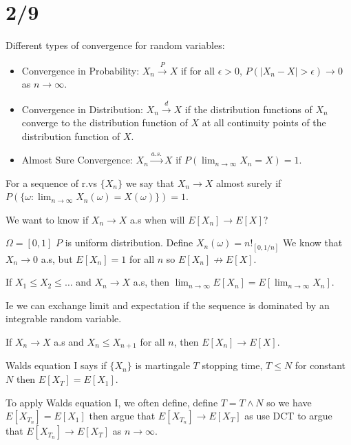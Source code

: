 \documentclass[answers,12pt,addpoints]{exam}
\begin{document}
\section{2/9}
\begin{remark}
    Different types of convergence for random variables:
    \begin{itemize}
        \item Convergence in Probability: $X_n \xrightarrow{P} X$ if for all $\epsilon > 0$, $P(|X_n - X| > \epsilon) \to 0$ as $n \to \infty$.
        \item Convergence in Distribution: $X_n \xrightarrow{d} X$ if the distribution functions of $X_n$ converge to the distribution function of $X$ at all continuity points of the distribution function of $X$.
        \item Almost Sure Convergence: $X_n \xrightarrow{a.s.} X$ if $P(\lim_{n \to \infty} X_n = X) = 1$.
    \end{itemize}
\end{remark}
\begin{definition}
    For a sequence of r.vs $\{X_n\}$ we say that $X_n \to X$ almost surely if $P(\{\omega : \lim_{n \to \infty} X_n(\omega) = X(\omega)\}) = 1$.

    We want to know if $X_n \to X$ a.s when will $E[X_n] \to E[X]$? 

    \begin{example}
        $\Omega = [0,1]$ $P$ is uniform distribution. Define $X_n(\omega) = n!_{[0,1/n]}$ We know that $X_n \to 0$ a.s, but $E[X_n] = 1$ for all $n$ so $E[X_n] \not\to E[X]$.
    \end{example}
\end{definition}
\begin{definition}
    If $X_1 \leq X_2 \leq \ldots$ and $X_n \to X$ a.s, then $\lim_{n \to \infty} E[X_n] = E[ \lim_{n \to \infty} X_n]$.

    Ie we can exchange limit and expectation if the sequence is dominated by an integrable random variable.
    
\end{definition}
\begin{definition}
    If $X_n \to X$ a.s and $X_n \leq X_{n+1}$ for all $n$, then $E[X_n] \to E[X]$.
        
\end{definition}
\begin{remark}
        Walds equation I says if $\{X_n\}$ is martingale $T$ stopping time, $T \leq N$ for constant $N$ then $E[X_T] = E[X_1]$.

        To apply Walds equation I, we often define, define $T = T \wedge N$ so we have $E[X_{T_n}] = E[X_1]$ then argue that $E[X_{T_n}] \to E[X_T]$ as use DCT to argue that $E[X_{T_n}] \to E[X_T]$ as $n \to \infty$.
\end{remark}
\end{document}

